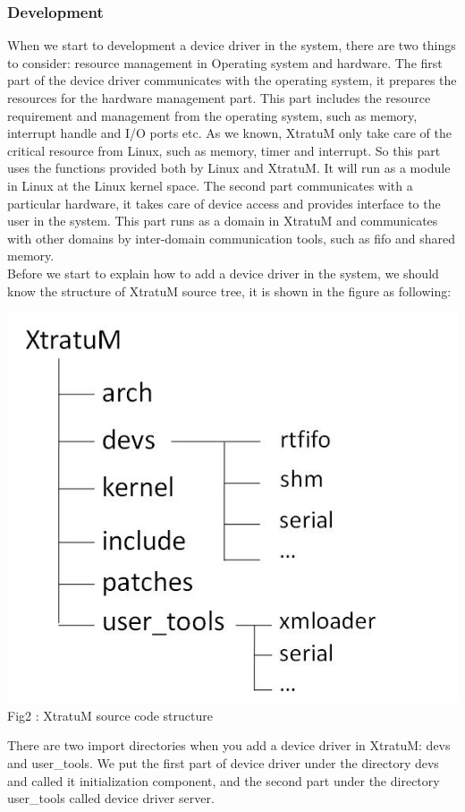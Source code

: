 \subsubsection{Development}
When we start to development a device driver in the system, there are two things to consider: resource management in Operating system and hardware. The first part of the device driver communicates with the operating system, it prepares the resources for the hardware management part. This part includes the resource requirement and management from the operating system, such as memory, interrupt handle and I/O ports etc. As we known, XtratuM only take care of the critical resource from Linux, such as memory, timer and interrupt. So this part uses the functions provided both by Linux and XtratuM. It will run as a module in Linux at the Linux kernel space. The second part communicates with a particular hardware, it takes care of device access and provides interface to the user in the system. This part runs as a domain in XtratuM and communicates with other domains by inter-domain communication tools, such as fifo and shared memory.
\\
Before we start to explain how to add a device driver in the system, we should know the structure of XtratuM source tree, it is shown in the figure as following:
\\
\begin{center}
	\includegraphics[width=0.8\linewidth]{graph/dev02.jpg}
\\
	Fig2 : XtratuM source code structure
\end{center}
There are two import directories when you add a device driver in XtratuM: devs and user\_tools. We put the first part of device driver under the directory devs and called it initialization component, and the second part under the directory user\_tools called device driver server.
\\

